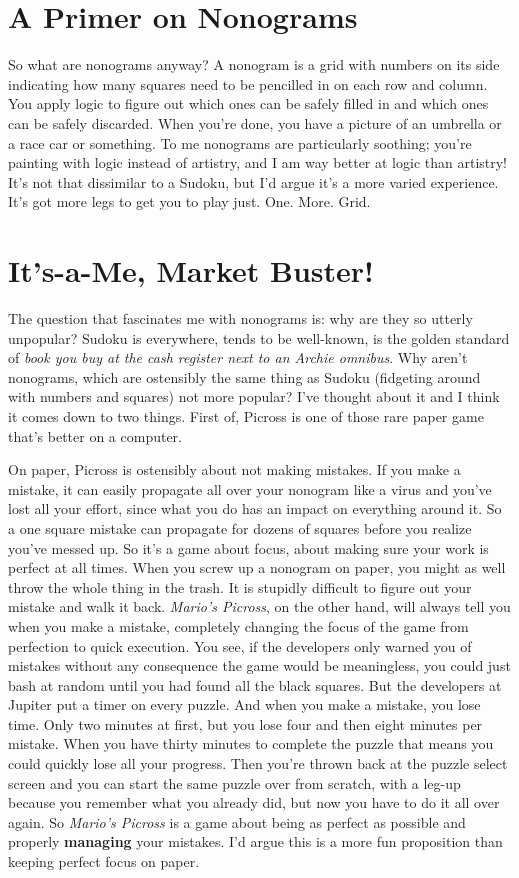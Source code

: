 \documentclass{book}
\begin{document}
\FloatBarrier\section*{A Primer on Nonograms}
So what are nonograms anyway? A nonogram is a grid with numbers on its side indicating how many squares need to be pencilled in on each row and column. You apply logic to figure out which ones can be safely filled in and which ones can be safely discarded. When you’re done, you have a picture of an umbrella or a race car or something. To me nonograms are particularly soothing; you’re painting with logic instead of artistry, and I am way better at logic than artistry! It’s not that dissimilar to a Sudoku, but I’d argue it’s a more varied experience. It’s got more legs to get you to play just. One. More. Grid.\par
\FloatBarrier\section*{It’s-a-Me, Market Buster!}
The question that fascinates me with nonograms is: why are they so utterly unpopular? Sudoku is everywhere, tends to be well-known, is the golden standard of \emph{book you buy at the cash register next to an Archie omnibus}. Why aren’t nonograms, which are ostensibly the same thing as Sudoku (fidgeting around with numbers and squares) not more popular? I’ve thought about it and I think it comes down to two things. First of, Picross is one of those rare paper game that’s better on a computer.\par
On paper, Picross is ostensibly about not making mistakes. If you make a mistake, it can easily propagate all over your nonogram like a virus and you’ve lost all your effort, since what you do has an impact on everything around it. So a one square mistake can propagate for dozens of squares before you realize you’ve messed up. So it’s a game about focus, about making sure your work is perfect at all times. When you screw up a nonogram on paper, you might as well throw the whole thing in the trash. It is stupidly difficult to figure out your mistake and walk it back. \emph{Mario’s Picross}, on the other hand, will always tell you when you make a mistake, completely changing the focus of the game from perfection to quick execution. You see, if the developers only warned you of mistakes without any consequence the game would be meaningless, you could just bash at random until you had found all the black squares. But the developers at Jupiter put a timer on every puzzle. And when you make a mistake, you lose time. Only two minutes at first, but you lose four and then eight minutes per mistake. When you have thirty minutes to complete the puzzle that means you could quickly lose all your progress. Then you’re thrown back at the puzzle select screen and you can start the same puzzle over from scratch, with a leg-up because you remember what you already did, but now you have to do it all over again. So \emph{Mario’s Picross} is a game about being as perfect as possible and properly \textbf{managing} your mistakes. I’d argue this is a more fun proposition than keeping perfect focus on paper.\par
\end{document}
